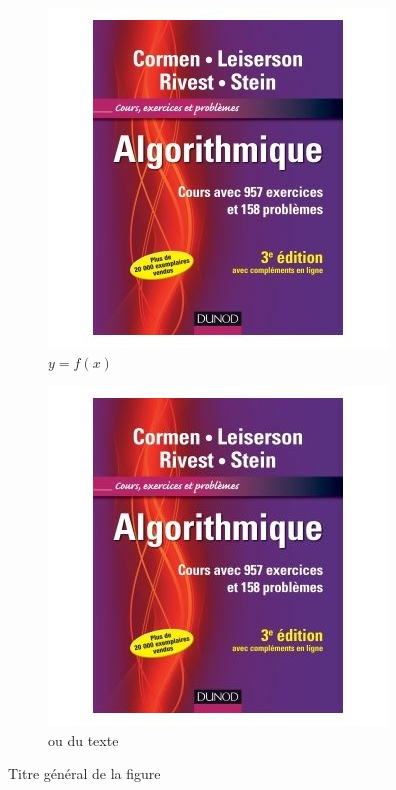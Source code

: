 \documentclass{rapportAlgoM1}
\begin{document}
\begin{figure}
	\centering
	\begin{subfigure}[b]{0.3\textwidth}
		\includegraphics[width=\textwidth]{images/livreAlgoRivest.jpg}
		\caption{$y=f(x)$}
		\label{fig:subfig1}
	\end{subfigure}
	\quad
	\begin{subfigure}[b]{0.3\textwidth}
		\includegraphics[width=\textwidth]{images/livreAlgoRivest.jpg}
		\caption{ou du texte}
		\label{fig:subfig2}
	\end{subfigure}
	\caption{Titre général de la figure}
	\label{fig:subfigureComplete}
\end{figure}
\end{document}
